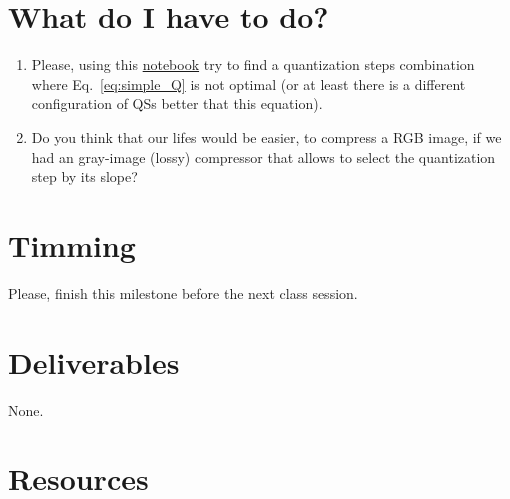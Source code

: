 
\section{What do I have to do?}

\begin{enumerate}
\item Please, using this
  \href{https://github.com/Sistemas-Multimedia/Sistemas-Multimedia.github.io/blob/master/milestones/05-RGB_compression/RGB_compression.ipynb}{notebook}
  try to find a quantization steps combination where
  Eq.~\ref{eq:simple_Q} is not optimal (or at least there is a
  different configuration of QSs better that this equation).
\item Do you think that our lifes would be easier, to compress a RGB
  image, if we had an gray-image (lossy) compressor that allows to
  select the quantization step by its slope?
\end{enumerate}


\section{Timming}

Please, finish this milestone before the next class session.

\section{Deliverables}

None.

\section{Resources}

\renewcommand{\addcontentsline}[3]{} %

